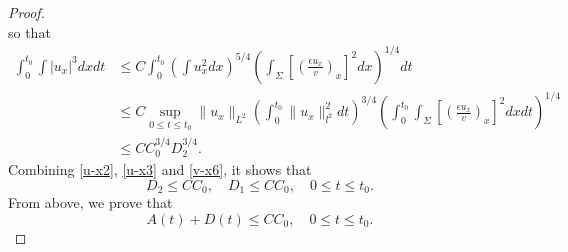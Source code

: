 \documentclass[a4paper,oneside,11pt]{article}
\numberwithin{equation}{section}
\begin{document}
\begin{proof}
\[\]
so that
\begin{equation}\label{u-x3}
\begin{aligned}
\int_{0}^{t_{0}} \int\left|u_{x}\right|^{3} d x d t &\leq C \int_{0}^{t_{0}}\left(\int u_{x}^{2} d x\right)^{5/4}\left(\int_\Sigma\left[\left(\frac{\epsilon u_{x}}{v}\right)_{x}\right]^{2} d x\right)^{1/4} d t \\
&\leq C \sup_{0 \leq t \leq t_{0}}\|u_{x}\|_{L^2}\left(\int_{0}^{t_{0}} \|u_{x}\|_{l^2}^{2}d t\right)^{3/4}\left(\int_{0}^{t_{0}} \int_\Sigma\left[\left(\frac{\epsilon u_{x}}{v}\right)_{x}\right]^{2} d x d t\right)^{1/4} \\
&\leq C C_{0}^{3/4} D_{2}^{3/4}.
\end{aligned}
\end{equation}
Combining \eqref{u-x2}, \eqref{u-x3} and \eqref{v-x6}, it shows that
\begin{equation}
  D_2\leq CC_0,\quad D_1\leq CC_0,\quad 0\leq t\leq t_0.
\end{equation}
From above, we  prove that
\begin{equation}\label{ad-1}
  A(t)+D(t)\leq CC_0,\quad 0\leq t\leq t_0.
\end{equation}


\end{proof}
\end{document}
